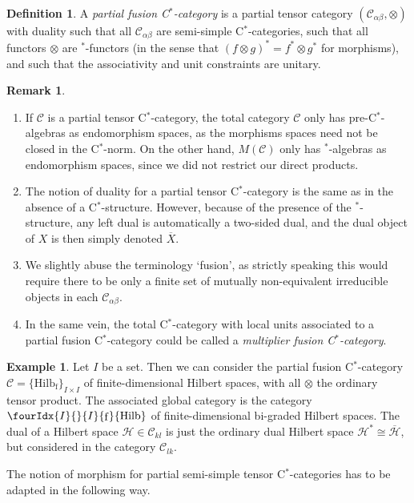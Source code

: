 \documentclass[10pt]{article}
\DeclareMathOperator{\fin}{\mathrm{f}}
\newcommand{\Hsp}{\mathcal{H}}
\newcommand{\CatC}{\mathcal{C}}
\newcommand{\CatCC}{\mathscr{C}}
\newcommand{\Hilb}{\mathrm{Hilb}}
\newcommand{\Hilbif}{\Gr{\mathrm{Hilb}}{I}{I}{}{\fin}}
\newcommand{\Gr}[5]{\fourIdx{#2}{#4}{#3}{#5}{#1}}%
\theoremstyle{definition}
\newtheorem{Def}[Theorem]{Definition}
\newtheorem{Rem}[Theorem]{Remark}
\newtheorem{Exa}[Theorem]{Example}
\numberwithin{equation}{section}
\begin{document}
\begin{Def} A \emph{partial fusion C$^*$-category} is a partial tensor category $(\CatC_{\alpha\beta},\otimes)$ with duality such that all $\CatC_{\alpha\beta}$ are semi-simple C$^*$-categories, such that all functors $\otimes$ are $^*$-functors (in the sense that $(f\otimes g)^* = f^*\otimes g^*$ for morphisms), and such that the associativity and unit constraints are unitary.
\end{Def} 

\begin{Rem}
\begin{enumerate}
\item If $\CatCC$ is a partial tensor C$^*$-category, the total category $\CatC$ only has pre-C$^*$-algebras as endomorphism spaces, as the morphisms spaces need not be closed in the C$^*$-norm. On the other hand, $M(\CatC)$ only has $^*$-algebras as endomorphism spaces, since we did not restrict our direct products. 
\item The notion of duality for a partial tensor C$^*$-category is the same as in the absence of a C$^*$-structure. However, because of the presence of the $^*$-structure, any left dual is automatically a two-sided dual, and the dual object of $X$ is then simply denoted $\overline{X}$.  
\item We slightly abuse the terminology `fusion', as strictly speaking this would require there to be only a finite set of mutually non-equivalent irreducible objects in each $\CatC_{\alpha\beta}$.
\item In the same vein, the total C$^*$-category with local units associated to a partial fusion C$^*$-category could be called a \emph{multiplier fusion C$^*$-category}.
\end{enumerate}
\end{Rem}

\begin{Exa} Let $I$ be a set. Then we can consider the partial fusion C$^*$-category $\CatCC = \{\Hilb_{\fin}\}_{I\times I}$ of finite-dimensional Hilbert spaces, with all $\otimes$ the ordinary tensor product. The associated global category is the category $\Hilbif$ of finite-dimensional bi-graded Hilbert spaces. The dual of a Hilbert space $\Hsp \in \CatC_{kl}$ is just the ordinary dual Hilbert space $\Hsp^* \cong \overline{\Hsp}$, but considered in the category $\CatC_{lk}$. 
\end{Exa}

The notion of morphism for partial semi-simple tensor C$^*$-categories has to be adapted in the following way.
\end{document}
